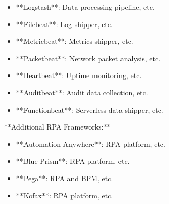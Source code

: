 \documentclass[11pt,a4paper]{article}
\begin{document}
\begin{itemize}
\item **Logstash**: Data processing pipeline, etc.
\end{itemize}

\begin{itemize}
\item **Filebeat**: Log shipper, etc.
\end{itemize}

\begin{itemize}
\item **Metricbeat**: Metrics shipper, etc.
\end{itemize}

\begin{itemize}
\item **Packetbeat**: Network packet analysis, etc.
\end{itemize}

\begin{itemize}
\item **Heartbeat**: Uptime monitoring, etc.
\end{itemize}

\begin{itemize}
\item **Auditbeat**: Audit data collection, etc.
\end{itemize}

\begin{itemize}
\item **Functionbeat**: Serverless data shipper, etc.
\end{itemize}

**Additional RPA Frameworks:**

\begin{itemize}
\item **Automation Anywhere**: RPA platform, etc.
\end{itemize}

\begin{itemize}
\item **Blue Prism**: RPA platform, etc.
\end{itemize}

\begin{itemize}
\item **Pega**: RPA and BPM, etc.
\end{itemize}

\begin{itemize}
\item **Kofax**: RPA platform, etc.
\end{itemize}
\end{document}
